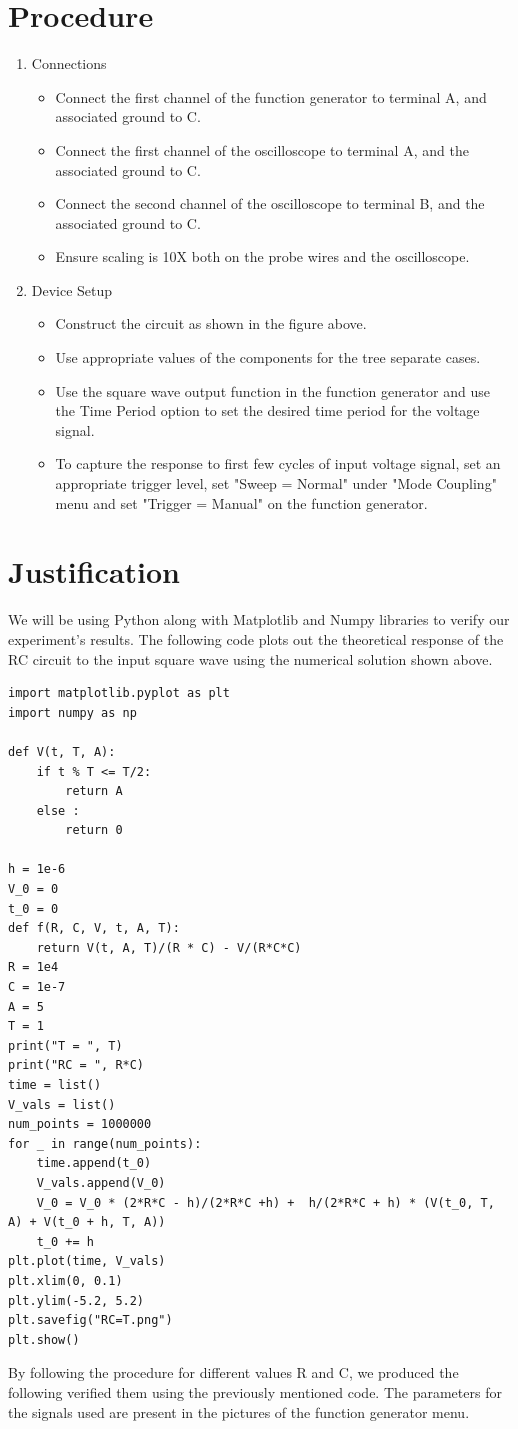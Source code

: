 \documentclass[a4paper,12pt]{article}
\begin{document}
\section{Procedure}
\begin{enumerate}
\item Connections
\begin{itemize}
\item Connect the first channel of the function generator to terminal A, and associated ground to C.
\item Connect the first channel of the oscilloscope to terminal A, and the associated ground to C.
\item Connect the second channel of the oscilloscope to terminal B, and the associated ground to C.
\item Ensure scaling is 10X both on the probe wires and the oscilloscope.
\end{itemize}
\item Device Setup
\begin{itemize}
\item Construct the circuit as shown in the figure above.
\item Use appropriate values of the components for the tree separate cases.
\item Use the square wave output function in the function generator and use the Time Period option to set the desired time period for the voltage signal.
\item To capture the response to first few cycles of input voltage signal, set an appropriate trigger level, set "Sweep = Normal" under "Mode Coupling" menu and set "Trigger = Manual" on the function generator.
\end{itemize}
\end{enumerate}
\section{Justification}
We will be using Python along with Matplotlib and Numpy libraries to verify our experiment's results. The following code plots out the theoretical response of the RC circuit to the input square wave using the numerical solution shown above.
\begin{verbatim}
import matplotlib.pyplot as plt 
import numpy as np 

def V(t, T, A):
    if t % T <= T/2:
        return A 
    else :
        return 0

h = 1e-6
V_0 = 0
t_0 = 0
def f(R, C, V, t, A, T):
    return V(t, A, T)/(R * C) - V/(R*C*C)
R = 1e4
C = 1e-7
A = 5
T = 1
print("T = ", T)
print("RC = ", R*C)
time = list()
V_vals = list()
num_points = 1000000
for _ in range(num_points):
    time.append(t_0)
    V_vals.append(V_0)
    V_0 = V_0 * (2*R*C - h)/(2*R*C +h) +  h/(2*R*C + h) * (V(t_0, T, A) + V(t_0 + h, T, A))
    t_0 += h
plt.plot(time, V_vals)
plt.xlim(0, 0.1)
plt.ylim(-5.2, 5.2)
plt.savefig("RC=T.png")
plt.show()
\end{verbatim}
By following the procedure for different values R and C, we produced the following  verified them using the previously mentioned code.
The parameters for the signals used are present in the pictures of the function generator menu.
\end{document}
